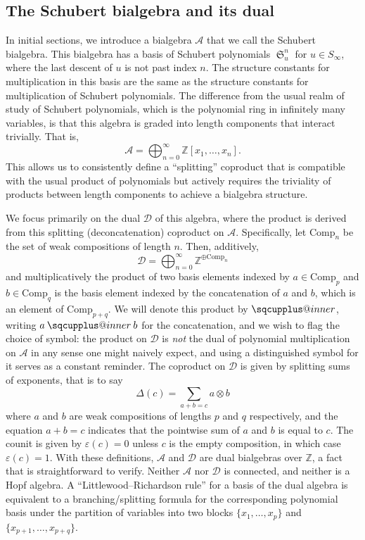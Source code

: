 \documentclass[a4paper,fleqn]{cas-sc}
\makeatletter
\newcommand{\sqcupplus@inner}[2]{%
  \vcenter{\hbox{\ooalign{%
    \hfil$\m@th#1\sqcup$\hfil\cr
    \hfil\raisebox{0.15ex}{$\m@th#1\scriptscriptstyle+$}\hfil\cr
  }}}%
}
\newcommand{\sqcupplus}{\mathbin{\mathpalette\sqcupplus@inner\relax}}
\theoremstyle{definition}
\theoremstyle{remark}
\numberwithin{equation}{subsection}
\DeclareMathOperator{\sch}{\mathfrak{S}}
\newcommand{\coma}{\mathcal{A}}
\newcommand{\dcoma}{\mathcal{D}}
\makeatother
\begin{document}
\subsection*{The Schubert bialgebra and its dual} In initial sections, we introduce a bialgebra $\coma$ that we call the Schubert bialgebra. This bialgebra has a basis of Schubert polynomials $\sch_u^n$ for $u\in S_\infty$, where the last descent of $u$ is not past index $n$. The structure constants for multiplication in this basis are the same as the structure constants for multiplication of Schubert polynomials. The difference from the usual realm of study of Schubert polynomials, which is the polynomial ring in infinitely many variables, is that this algebra is graded into length components that interact trivially. That is,
$$\coma = \bigoplus_{n=0}^\infty \mathbb{Z}[x_1,\ldots,x_n]\text{.}$$
This allows us to consistently define a ``splitting'' coproduct that is compatible with the usual product of polynomials but actively requires the triviality of products between length components to achieve a bialgebra structure.

We focus primarily on the dual $\dcoma$ of this algebra, where the product is derived from this splitting (deconcatenation) coproduct on $\coma$. Specifically, let $\mathrm{Comp}_n$ be the set of weak compositions of length $n$. Then, additively,
$$\dcoma = \bigoplus_{n=0}^\infty \mathbb{Z}^{\oplus \mathrm{Comp}_n}$$
and multiplicatively the product of two basis elements indexed by $a\in \mathrm{Comp}_p$ and $b\in \mathrm{Comp}_q$ is the basis element indexed by the concatenation of $a$ and $b$, which is an element of $\mathrm{Comp}_{p+q}$. We will denote this product by $\sqcupplus$, writing $a\sqcupplus b$ for the concatenation, and we wish to flag the choice of symbol: the product on $\dcoma$ is \emph{not} the dual of polynomial multiplication on $\coma$ in any sense one might naively expect, and using a distinguished symbol for it serves as a constant reminder. The coproduct on $\dcoma$ is given by splitting sums of exponents, that is to say
$$\Delta(c) = \sum_{a+b=c} a\otimes b$$
where $a$ and $b$ are weak compositions of lengths $p$ and $q$ respectively, and the equation $a+b=c$ indicates that the pointwise sum of $a$ and $b$ is equal to $c$. The counit is given by $\varepsilon(c)=0$ unless $c$ is the empty composition, in which case $\varepsilon(c)=1$. With these definitions, $\coma$ and $\dcoma$ are dual bialgebras over $\mathbb{Z}$, a fact that is straightforward to verify. Neither $\coma$ nor $\dcoma$ is connected, and neither is a Hopf algebra. A ``Littlewood--Richardson rule'' for a basis of the dual algebra is equivalent to a branching/splitting formula for the corresponding polynomial basis under the partition of variables into two blocks $\{x_1,\ldots,x_p\}$ and $\{x_{p+1},\ldots,x_{p+q}\}$.
\end{document}
